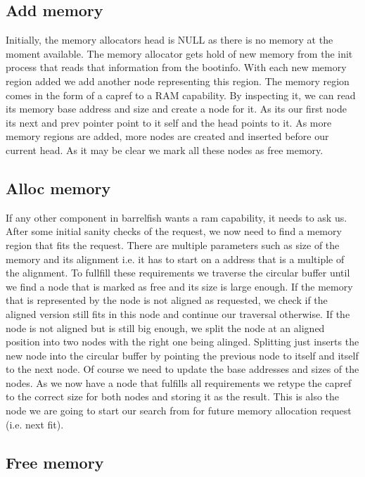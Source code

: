 \subsection{Add memory}

Initially, the memory allocators head is NULL as there is no memory at the
moment available. The memory allocator gets hold of new memory from the init
process that reads that information from the bootinfo. With each new memory
region added we add another node representing this region. The memory region
comes in the form of a capref to a RAM capability. By inspecting it, we can read
its memory base address and size and create a node for it. As its our first node
its next and prev pointer point to it self and the head points to it.  As more
memory regions are added, more nodes are created and inserted before our current
head. As it may be clear we mark all these nodes as free memory.

\subsection{Alloc memory}

If any other component in barrelfish wants a ram capability, it needs to ask us.
After some initial sanity checks of the request, we now need to find a memory
region that fits the request. There are multiple parameters such as size of the
memory and its alignment i.e. it has to start on a address that is a multiple of
the alignment.  To fullfill these requirements we traverse the circular buffer
until we find a node that is marked as free and its size is large enough. If the
memory that is represented by the node is not aligned as requested, we check if
the aligned version still fits in this node and continue our traversal
otherwise.  If the node is not aligned but is still big enough, we split the
node at an aligned position into two nodes with the right one being alinged.
Splitting just inserts the new node into the circular buffer by pointing the
previous node to itself and itself to the next node. Of course we need to update
the base addresses and sizes of the nodes.  As we now have a node that fulfills
all requirements we retype the capref to the correct size for both nodes and
storing it as the result.  This is also the node we are going to start our
search from for future memory allocation request (i.e. next fit).

\subsection{Free memory}

